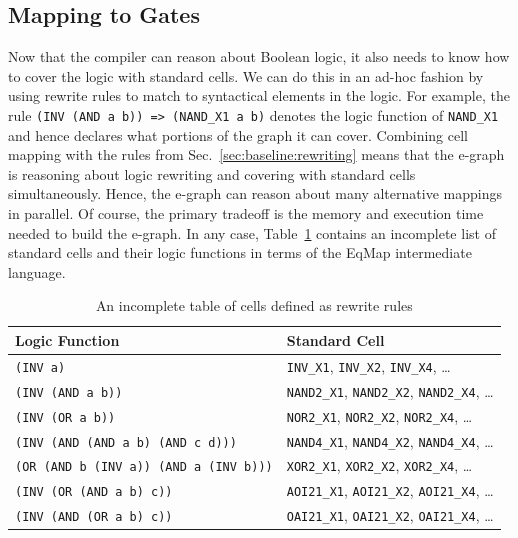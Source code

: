 \documentclass[10pt,letterpaper]{article}
\begin{document}
\subsection{Mapping to Gates}\label{sec:baseline:mapping}

Now that the compiler can reason about Boolean logic, it also needs to know how
to cover the logic with standard cells. We can do this in an ad-hoc fashion by
using rewrite rules to match to syntactical elements in the logic. For example,
the rule \texttt{(INV (AND a b)) => (NAND\_X1 a b)} denotes the logic function
of \texttt{NAND\_X1} and hence declares what portions of the graph it can
cover. Combining cell mapping with the rules from
Sec.~\ref{sec:baseline:rewriting} means that the e-graph is reasoning about
logic rewriting and covering with standard cells simultaneously. Hence, the
e-graph can reason about many alternative mappings in parallel. Of course, the
primary tradeoff is the memory and execution time needed to build the e-graph.
In any case, Table~\ref{tab:cells} contains an incomplete list of standard
cells and their logic functions in terms of the EqMap intermediate language.

\begin{table}[h]
    \centering
    \begin{tabular}{ll}
        \toprule
        \textbf{Logic Function}                       & \textbf{Standard Cell}                                             \\ \midrule
        \texttt{(INV a)}                              & \texttt{INV\_X1}, \texttt{INV\_X2}, \texttt{INV\_X4}, \ldots       \\
        \texttt{(INV (AND a b))}                      & \texttt{NAND2\_X1}, \texttt{NAND2\_X2}, \texttt{NAND2\_X4}, \ldots \\
        \texttt{(INV (OR a b))}                       & \texttt{NOR2\_X1}, \texttt{NOR2\_X2}, \texttt{NOR2\_X4}, \ldots    \\
        \texttt{(INV (AND (AND a b) (AND c d)))}      & \texttt{NAND4\_X1}, \texttt{NAND4\_X2}, \texttt{NAND4\_X4}, \ldots \\
        \texttt{(OR (AND b (INV a)) (AND a (INV b)))} & \texttt{XOR2\_X1}, \texttt{XOR2\_X2}, \texttt{XOR2\_X4}, \ldots    \\
        \texttt{(INV (OR (AND a b) c))}               & \texttt{AOI21\_X1}, \texttt{AOI21\_X2}, \texttt{AOI21\_X4}, \ldots \\
        \texttt{(INV (AND (OR a b) c))}               & \texttt{OAI21\_X1}, \texttt{OAI21\_X2}, \texttt{OAI21\_X4}, \ldots \\
        \bottomrule
    \end{tabular}
    \caption{An incomplete table of cells defined as rewrite rules}\label{tab:cells}
\end{table}
\end{document}
